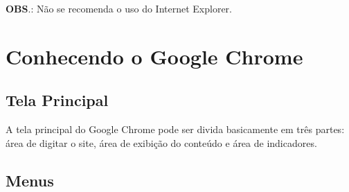 \documentclass[hidelinks,12pt]{article}
\begin{document}
\textbf{OBS}.: Não se recomenda o uso do Internet Explorer.

\section{Conhecendo o Google Chrome}
		
\subsection{Tela Principal}
A tela principal do Google Chrome pode ser divida basicamente em três partes: área de digitar o site, área de exibição do conteúdo e área de indicadores.

\subsection{Menus}
\end{document}
